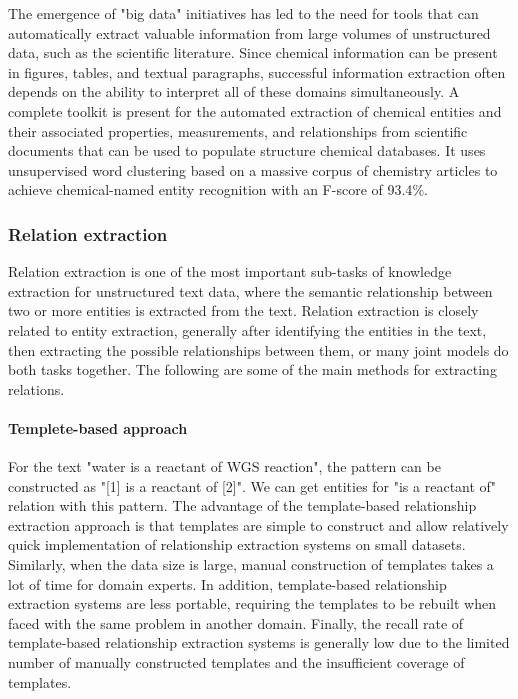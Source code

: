 \documentclass[%
 aip,
 jmp,%
 amsmath,amssymb,
 reprint,%
]{revtex4-2}
\begin{document}
The emergence of "big data" initiatives has led to the need for tools that can automatically extract valuable information from large volumes of unstructured data, such as the scientific literature. Since chemical information can be present in figures, tables, and textual paragraphs, successful information extraction often depends on the ability to interpret all of these domains simultaneously. A complete toolkit is present for the automated extraction of chemical entities and their associated properties, measurements, and relationships from scientific documents that can be used to populate structure chemical databases\cite{swain2016chemdataextractor}. It uses unsupervised word clustering based\cite{birke2006clustering} on a massive corpus of chemistry articles to achieve chemical-named entity recognition with an F-score of 93.4$\%$.

\subsubsection{Relation extraction}
Relation extraction\cite{bach2007review, pawar2017relation} is one of the most important sub-tasks of knowledge extraction for unstructured text data, where the semantic relationship between two or more entities is extracted from the text. Relation extraction is closely related to entity extraction, generally after identifying the entities in the text, then extracting the possible relationships between them, or many joint models do both tasks together\cite{yu2020relationship}. The following are some of the main methods for extracting relations.

\paragraph{Templete-based approach}
For the text "water is a reactant of WGS reaction", the pattern can be constructed as "[1] is a reactant of [2]". We can get entities for "is a reactant of" relation with this pattern. The advantage of the template-based relationship extraction approach\cite{chambers2011template} is that templates are simple to construct and allow relatively quick implementation of relationship extraction systems on small datasets. Similarly, when the data size is large, manual construction of templates takes a lot of time for domain experts. In addition, template-based relationship extraction systems are less portable, requiring the templates to be rebuilt when faced with the same problem in another domain. Finally, the recall rate of template-based relationship extraction systems is generally low due to the limited number of manually constructed templates and the insufficient coverage of templates\cite{flynn2007automated, romano2006investigating}.
\end{document}
